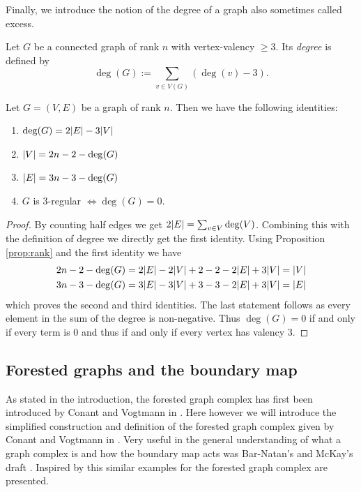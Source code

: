Finally, we introduce the notion of the degree of a graph also sometimes called excess.
\begin{definition}
	Let $G$ be a connected graph of rank $n$ with vertex-valency $\geq 3$. Its \emph{degree} is defined by
	\[
		\deg(G) := \sum_{v \in V(G)} (\deg(v) - 3)
	.\] 
\end{definition}

\begin{proposition}
	Let $G = (V,E)$ be a graph of rank $n$. Then we have the following identities:
	\begin{enumerate}
		\item $\deg(G) = 2 \abs{E} - 3 \abs{V}$
		\item $\abs{V} = 2n -2 - \deg(G)$
		\item $\abs{E} = 3n - 3 - \deg(G)$
		\item $G$ is $3$-regular $\Leftrightarrow \deg(G) = 0$.
	\end{enumerate}	
\end{proposition}

\begin{proof}
	By counting half edges we get $2 \abs{E} = \sum_{v \in V} \deg(V)$.
	Combining this with the definition of degree we directly get the first identity.
	Using Proposition \ref{prop:rank} and the first identity we have
	\begin{align*}
		2 n -2 - \deg(G) &= 2 \abs{E} - 2 \abs{V} + 2 - 2 - 2\abs{E} + 3 \abs{V} = \abs{V}\\
		3 n -3 - \deg(G) &= 3 \abs{E} - 3 \abs{V} + 3 - 3 - 2\abs{E} + 3 \abs{V} = \abs{E}
	\end{align*}
	which proves the second and third identities. The last statement follows as every element in the sum of the degree is non-negative.
	Thus $\deg(G) = 0$ if and only if every term is $0$ and thus if and only if every vertex has valency $3$.
\end{proof}

\subsection{Forested graphs and the boundary map}
As stated in the introduction, the forested graph complex has first been introduced by Conant and Vogtmann in \cite{conant03}.
Here however we will introduce the simplified construction and definition of the forested graph complex given by Conant and Vogtmann in \cite{conant08}.
Very useful in the general understanding of  what a graph complex is and how the boundary map acts was Bar-Natan's and McKay's draft \cite{natan01}.
Inspired by this similar examples for the forested graph complex are presented.

